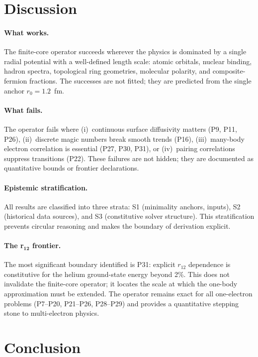 \documentclass[11pt,a4paper]{article}
\begin{document}
\section{Discussion}
\label{sec:discussion}

\paragraph{What works.}
The finite-core operator succeeds wherever the physics is dominated by a single radial potential with a well-defined length scale: atomic orbitals, nuclear binding, hadron spectra, topological ring geometries, molecular polarity, and composite-fermion fractions. The successes are not fitted; they are predicted from the single anchor $r_0 = 1.2$~fm.

\paragraph{What fails.}
The operator fails where (i)~continuous surface diffusivity matters (P9, P11, P26), (ii)~discrete magic numbers break smooth trends (P16), (iii)~many-body electron correlation is essential (P27, P30, P31), or (iv)~pairing correlations suppress transitions (P22). These failures are not hidden; they are documented as quantitative bounds or frontier declarations.

\paragraph{Epistemic stratification.}
All results are classified into three strata: S1 (minimality anchors, inputs), S2 (historical data sources), and S3 (constitutive solver structure). This stratification prevents circular reasoning and makes the boundary of derivation explicit.

\paragraph{The r$_{\mathbf{12}}$ frontier.}
The most significant boundary identified is P31: explicit $r_{12}$ dependence is constitutive for the helium ground-state energy beyond 2\%. This does not invalidate the finite-core operator; it locates the scale at which the one-body approximation must be extended. The operator remains exact for all one-electron problems (P7--P20, P21--P26, P28--P29) and provides a quantitative stepping stone to multi-electron physics.

\section{Conclusion}
\end{document}
